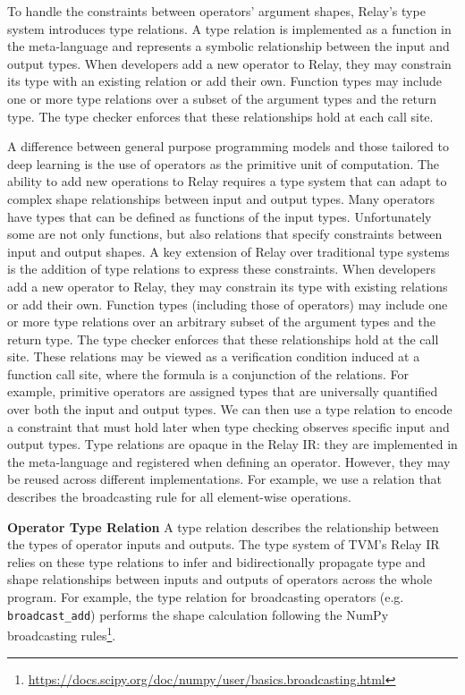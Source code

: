 To handle the constraints between operators' argument shapes, Relay's type system
introduces type relations.
A type relation is implemented as a function in the
meta-language and represents a symbolic relationship between
the input and output types.
When developers add a new operator to Relay, they may constrain its
type with an existing relation or add their own.
Function types may include
one or more type relations over a subset of the argument types and the return type.
The type checker enforces that these relationships hold at each call site.

A difference between general purpose programming models and those tailored to deep learning
  is the use of operators as the primitive unit of computation.
The ability to add new operations to Relay requires a type system that can adapt to
  complex shape relationships between input and output types.
Many operators have types that can be defined
  as functions of the input types.
Unfortunately some are not only functions,
  but also relations that specify constraints between input and output shapes.
A key extension of Relay over traditional type systems is the addition of type relations
  to express these constraints.
When developers add a new operator to Relay, they may constrain its
  type with existing relations or add their own.
Function types (including those of operators) may include
  one or more type relations over an arbitrary subset of the argument types and the return type.
The type checker enforces that these relationships hold at the call site.
These relations may be viewed as a verification condition induced at a
  function call site, where the formula is a conjunction of the relations.
For example, primitive operators are assigned types that are universally quantified over
  both the input and output types.
We can then use a type relation to encode a constraint that must hold later
  when type checking observes specific input and output types.
Type relations are opaque in the Relay IR: they are implemented in the
  meta-language and registered when defining an operator.
However, they may be reused across different implementations.
For example, we use a relation that describes the
  broadcasting rule for all element-wise operations.


\noindent
{\bf Operator Type Relation} A type relation describes the relationship between the types of operator inputs and outputs. The type system of TVM's Relay IR relies on these type relations to infer and bidirectionally propagate type and shape relationships between inputs and outputs of operators across the whole program.
For example, the type relation for broadcasting operators (e.g. \texttt{broadcast\_add}) performs the shape calculation following the NumPy broadcasting rules\footnote{\url{https://docs.scipy.org/doc/numpy/user/basics.broadcasting.html}}.

